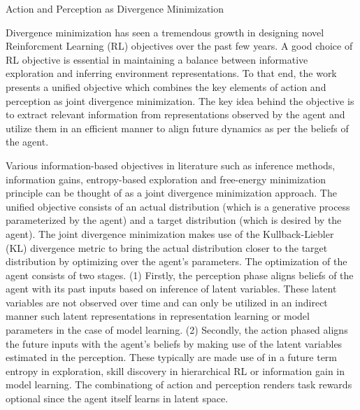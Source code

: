 \documentclass[10.5pt,letterpaper]{article}
\begin{document}
\begin{center}
  \large{Action and Perception as Divergence Minimization}
\end{center}


Divergence minimization has seen a tremendous growth in designing novel Reinforcment Learning (RL) objectives over the past few years. A good choice of RL objective is essential in maintaining a balance between informative exploration and inferring environment representations. To that end, the work presents a unified objective which combines the key elements of action and perception as joint divergence minimization. The key idea behind the objective is to extract relevant information from representations observed by the agent and utilize them in an efficient manner to align future dynamics as per the beliefs of the agent.

Various information-based objectives in literature such as inference methods, information gains, entropy-based exploration and free-energy minimization principle can be thought of as a joint divergence minimization approach. The unified objective consists of an actual distribution (which is a generative process parameterized by the agent) and a target distribution (which is desired by the agent). The joint divergence minimization makes use of the Kullback-Liebler (KL) divergence metric to bring the actual distribution closer to the target distribution by optimizing over the agent's parameters. The optimization of the agent consists of two stages. (1) Firstly, the perception phase aligns beliefs of the agent with its past inputs based on inference of latent variables. These latent variables are not observed over time and can only be utilized in an indirect manner such latent representations in representation learning or model parameters in the case of model learning. (2) Secondly, the action phased aligns the future inputs with the agent's beliefs by making use of the latent variables estimated in the perception. These typically are made use of in a future term entropy in exploration, skill discovery in hierarchical RL or information gain in model learning. The combinationg of action and perception renders task rewards optional since the agent itself learns in latent space.
\end{document}

